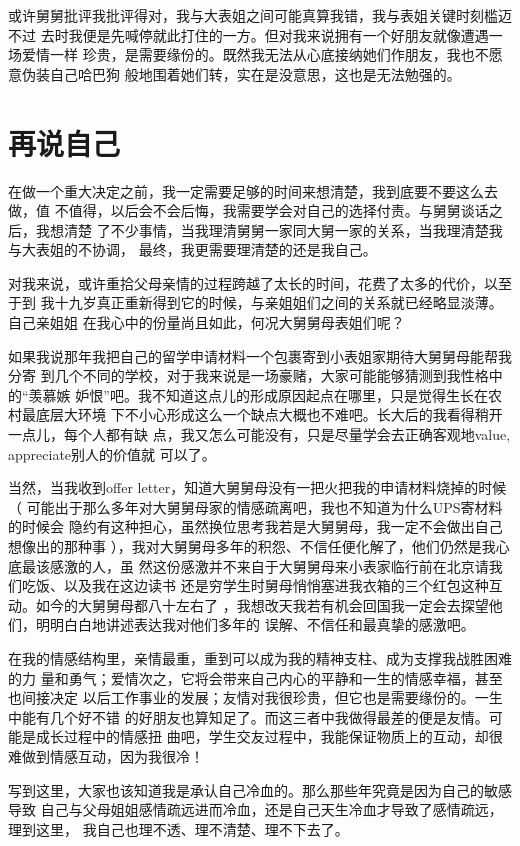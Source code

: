 \documentclass[12pt]{book}
\begin{document}
或许舅舅批评我批评得对，我与大表姐之间可能真算我错，我与表姐关键时刻槛迈不过
去时我便是先喊停就此打住的一方。但对我来说拥有一个好朋友就像遭遇一场爱情一样
珍贵，是需要缘份的。既然我无法从心底接纳她们作朋友，我也不愿意伪装自己哈巴狗
般地围着她们转，实在是没意思，这也是无法勉强的。
\section{再说自己}
\label{sec-9-83}

在做一个重大决定之前，我一定需要足够的时间来想清楚，我到底要不要这么去做，值
不值得，以后会不会后悔，我需要学会对自己的选择付责。与舅舅谈话之后，我想清楚
了不少事情，当我理清舅舅一家同大舅一家的关系，当我理清楚我与大表姐的不协调，
最终，我更需要理清楚的还是我自己。　

对我来说，或许重拾父母亲情的过程跨越了太长的时间，花费了太多的代价，以至于到
我十九岁真正重新得到它的时候，与亲姐姐们之间的关系就已经略显淡薄。自己亲姐姐
在我心中的份量尚且如此，何况大舅舅母表姐们呢？

如果我说那年我把自己的留学申请材料一个包裹寄到小表姐家期待大舅舅母能帮我分寄
到几个不同的学校，对于我来说是一场豪赌，大家可能能够猜测到我性格中的“羡慕嫉
妒恨”吧。我不知道这点儿的形成原因起点在哪里，只是觉得生长在农村最底层大环境
下不小心形成这么一个缺点大概也不难吧。长大后的我看得稍开一点儿，每个人都有缺
点，我又怎么可能没有，只是尽量学会去正确客观地value, appreciate别人的价值就
可以了。

当然，当我收到offer letter，知道大舅舅母没有一把火把我的申请材料烧掉的时候（
可能出于那么多年对大舅舅母家的情感疏离吧，我也不知道为什么UPS寄材料的时候会
隐约有这种担心，虽然换位思考我若是大舅舅母，我一定不会做出自己想像出的那种事
），我对大舅舅母多年的积怨、不信任便化解了，他们仍然是我心底最该感激的人，虽
然这份感激并不来自于大舅舅母来小表家临行前在北京请我们吃饭、以及我在这边读书
还是穷学生时舅母悄悄塞进我衣箱的三个红包这种互动。如今的大舅舅母都八十左右了
，我想改天我若有机会回国我一定会去探望他们，明明白白地讲述表达我对他们多年的
误解、不信任和最真挚的感激吧。

在我的情感结构里，亲情最重，重到可以成为我的精神支柱、成为支撑我战胜困难的力
量和勇气；爱情次之，它将会带来自己内心的平静和一生的情感幸福，甚至也间接决定
以后工作事业的发展；友情对我很珍贵，但它也是需要缘份的。一生中能有几个好不错
的好朋友也算知足了。而这三者中我做得最差的便是友情。可能是成长过程中的情感扭
曲吧，学生交友过程中，我能保证物质上的互动，却很难做到情感互动，因为我很冷！

写到这里，大家也该知道我是承认自己冷血的。那么那些年究竟是因为自己的敏感导致
自己与父母姐姐感情疏远进而冷血，还是自己天生冷血才导致了感情疏远，理到这里，
我自己也理不透、理不清楚、理不下去了。
\end{document}
